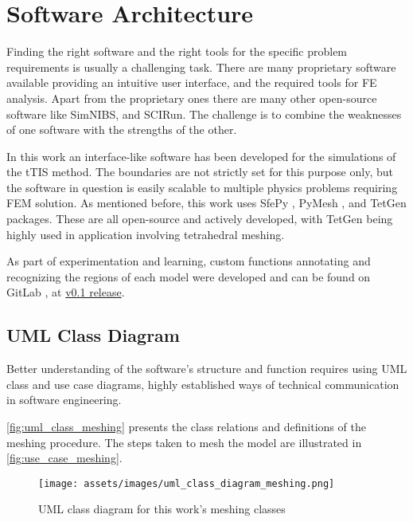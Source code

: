 \pagebreak
\chapter{Software Architecture}
\label{chap:soft_arch}

Finding the right software and the right tools for the specific problem requirements is usually a challenging task. There are many proprietary software available providing an intuitive user interface, and the required tools for \gls{FE} analysis. Apart from the proprietary ones there are many other open-source software like \gls{SimNIBS}, and SCIRun. The challenge is to combine the weaknesses of one software with the strengths of the other.

In this work an interface-like software has been developed for the simulations of the \gls{tTIS} method. The boundaries are not strictly set for this purpose only, but the software in question is easily scalable to multiple physics problems requiring \gls{FEM} solution. As mentioned before, this work uses SfePy \cite{Cimrman2019}, PyMesh \cite{pymesh}, and TetGen \cite{tetgen} packages. These are all open-source and actively developed, with TetGen \cite{tetgen} being highly used in application involving tetrahedral meshing.

As part of experimentation and learning, custom functions annotating and recognizing the regions of each model were developed and can be found on GitLab \cite{thesis_repo}, at \href{https://gitlab.com/ttis-simulations/ttis-software/-/releases#v0.1}{v0.1 release}. 

\section{UML Class Diagram}

Better understanding of the software's structure and function requires using \gls{UML} class and use case diagrams, highly established ways of technical communication in software engineering.

\autoref{fig:uml_class_meshing} presents the class relations and definitions of the meshing procedure. The steps taken to mesh the model are illustrated in \autoref{fig:use_case_meshing}.

\begin{figure}[H]
    \centering
    \texttt{[image: assets/images/uml\_class\_diagram\_meshing.png]}
    \caption{\gls{UML} class diagram for this work's meshing classes}
    \label{fig:uml_class_meshing}
\end{figure}

